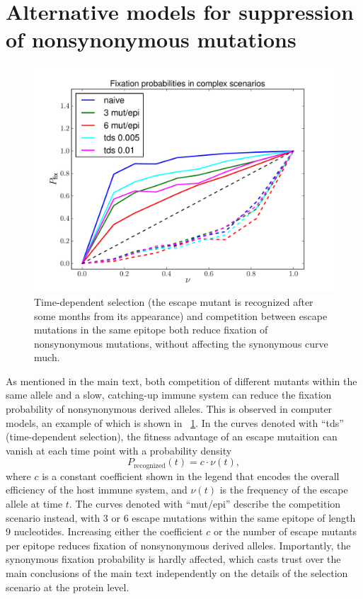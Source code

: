 \documentclass[rmp]{revtex4}
\begin{document}
\section{Alternative models for suppression of nonsynonymous mutations}
\begin{figure}[h]
\begin{center}
\includegraphics[width=0.5\linewidth]{simulations_graduallyepitopesandtimeselec}
\caption{Time-dependent selection (the escape mutant is recognized after some
months from its appearance) and competition between escape mutations in the same
epitope both reduce fixation of nonsynonymous mutations, without affecting the
synonymous curve much.}
\label{fig:tds_wec}
\end{center}
\end{figure}
As mentioned in the main text, both competition of different mutants within the
same allele and a slow, catching-up immune system can reduce the fixation
probability of nonsynonymous derived alleles. This is observed in computer
models, an example of which is shown in \figurename~\ref{fig:tds_wec}. In the
curves denoted with ``tds'' (time-dependent selection), the fitness advantage of
an escape mutaition can vanish at each time point with a probability density
\[ P_\text{recognized}(t) = c \cdot \nu(t), \]
where $c$ is a constant coefficient shown in the legend that encodes the overall
efficiency of the host immune system, and $\nu(t)$ is the frequency of the
escape allele at time $t$. The curves denoted with ``mut/epi'' describe the
competition scenario instead, with 3 or 6 escape mutations within the same
epitope of length 9 nucleotides. Increasing either the coefficient $c$ or the
number of escape mutants per epitope reduces fixation of nonsynonymous derived
alleles. Importantly, the synonymous fixation probability is hardly affected, which casts
trust over the main conclusions of the main text independently on the details of
the selection scenario at the protein level.



\end{document}
